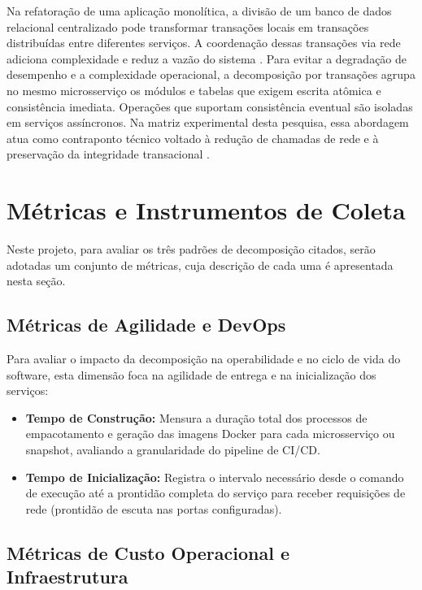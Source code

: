 Na refatoração de uma aplicação monolítica, a divisão de um banco de dados relacional centralizado pode transformar transações locais em transações distribuídas entre diferentes serviços. A coordenação dessas transações via rede adiciona complexidade e reduz a vazão do sistema \cite{richardson2018}. Para evitar a degradação de desempenho e a complexidade operacional, a decomposição por transações agrupa no mesmo microsserviço os módulos e tabelas que exigem escrita atômica e consistência imediata. Operações que suportam consistência eventual são isoladas em serviços assíncronos. Na matriz experimental desta pesquisa, essa abordagem atua como contraponto técnico voltado à redução de chamadas de rede e à preservação da integridade transacional \cite{newman2021}.

\section{Métricas e Instrumentos de Coleta}
\label{sec:metricas_coleta}

Neste projeto, para avaliar os três padrões de decomposição citados, serão adotadas um conjunto de métricas, cuja descrição de cada uma é apresentada nesta seção.


\subsection{Métricas de Agilidade e DevOps}

Para avaliar o impacto da decomposição na operabilidade e no ciclo de vida do software, esta dimensão foca na agilidade de entrega e na inicialização dos serviços:
\begin{itemize}
    \item \textbf{Tempo de Construção:} Mensura a duração total dos processos de empacotamento e geração das imagens Docker para cada microsserviço ou snapshot, avaliando a granularidade do pipeline de CI/CD.
    \item \textbf{Tempo de Inicialização:} Registra o intervalo necessário desde o comando de execução até a prontidão completa do serviço para receber requisições de rede (prontidão de escuta nas portas configuradas).
\end{itemize}

\subsection{Métricas de Custo Operacional e Infraestrutura}
\label{sec:metricas_infraestrutura}

